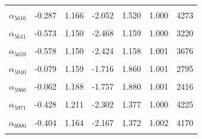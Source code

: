 \begin{longtable}{lrrrrrr}
\cellcolor{gray!10}{$\alpha_{5610}$} & \cellcolor{gray!10}{-0.280} & \cellcolor{gray!10}{1.144} & \cellcolor{gray!10}{-2.036} & \cellcolor{gray!10}{1.518} & \cellcolor{gray!10}{1.003} & \cellcolor{gray!10}{4551}\\
$\alpha_{5616}$ & -0.287 & 1.166 & -2.052 & 1.520 & 1.000 & 4273\\
\cellcolor{gray!10}{$\alpha_{5619}$} & \cellcolor{gray!10}{-0.680} & \cellcolor{gray!10}{1.169} & \cellcolor{gray!10}{-2.571} & \cellcolor{gray!10}{1.015} & \cellcolor{gray!10}{1.000} & \cellcolor{gray!10}{3016}\\
$\alpha_{5641}$ & -0.573 & 1.150 & -2.468 & 1.159 & 1.000 & 3220\\
\cellcolor{gray!10}{$\alpha_{5644}$} & \cellcolor{gray!10}{-0.397} & \cellcolor{gray!10}{1.198} & \cellcolor{gray!10}{-2.200} & \cellcolor{gray!10}{1.427} & \cellcolor{gray!10}{1.004} & \cellcolor{gray!10}{3891}\\
$\alpha_{5659}$ & -0.578 & 1.150 & -2.424 & 1.158 & 1.001 & 3676\\
\cellcolor{gray!10}{$\alpha_{5664}$} & \cellcolor{gray!10}{-0.607} & \cellcolor{gray!10}{1.161} & \cellcolor{gray!10}{-2.502} & \cellcolor{gray!10}{1.136} & \cellcolor{gray!10}{1.002} & \cellcolor{gray!10}{3540}\\
$\alpha_{5940}$ & -0.079 & 1.159 & -1.716 & 1.860 & 1.001 & 2795\\
\cellcolor{gray!10}{$\alpha_{5963}$} & \cellcolor{gray!10}{0.033} & \cellcolor{gray!10}{1.237} & \cellcolor{gray!10}{-1.680} & \cellcolor{gray!10}{2.086} & \cellcolor{gray!10}{1.003} & \cellcolor{gray!10}{1677}\\
$\alpha_{5966}$ & -0.062 & 1.188 & -1.757 & 1.880 & 1.001 & 2416\\
\cellcolor{gray!10}{$\alpha_{5970}$} & \cellcolor{gray!10}{-0.425} & \cellcolor{gray!10}{1.184} & \cellcolor{gray!10}{-2.253} & \cellcolor{gray!10}{1.368} & \cellcolor{gray!10}{1.004} & \cellcolor{gray!10}{4052}\\
$\alpha_{5971}$ & -0.428 & 1.211 & -2.302 & 1.377 & 1.000 & 4225\\
\cellcolor{gray!10}{$\alpha_{5992}$} & \cellcolor{gray!10}{-0.454} & \cellcolor{gray!10}{1.152} & \cellcolor{gray!10}{-2.266} & \cellcolor{gray!10}{1.361} & \cellcolor{gray!10}{1.000} & \cellcolor{gray!10}{4479}\\
$\alpha_{6000}$ & -0.404 & 1.164 & -2.167 & 1.372 & 1.002 & 4170\\
\cellcolor{gray!10}{$\alpha_{6001}$} & \cellcolor{gray!10}{-0.161} & \cellcolor{gray!10}{1.155} & \cellcolor{gray!10}{-1.826} & \cellcolor{gray!10}{1.717} & \cellcolor{gray!10}{1.000} & \cellcolor{gray!10}{3799}\\

\end{longtable}
